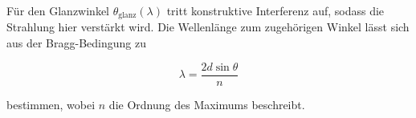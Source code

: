 Für den Glanzwinkel $\theta_\text{glanz}(\lambda)$ tritt konstruktive Interferenz 
auf, sodass die Strahlung hier verstärkt wird. Die Wellenlänge zum zugehörigen 
Winkel lässt sich aus der Bragg-Bedingung zu 

\begin{equation}
\lambda = \frac{2 d \sin{\theta}}{n}
\label{eqn:Bragg}
\end{equation}

bestimmen, wobei $n$ die Ordnung des Maximums beschreibt. 